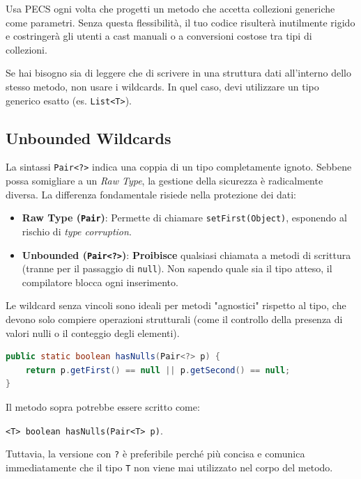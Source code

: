 \begin{bestpractice}
    Usa PECS ogni volta che progetti un metodo che accetta collezioni generiche come parametri. Senza questa flessibilità, il tuo codice risulterà inutilmente rigido e costringerà gli utenti a cast manuali o a conversioni costose tra tipi di collezioni.
\end{bestpractice}

\begin{warningbox}
    Se hai bisogno sia di leggere che di scrivere in una struttura dati all'interno dello stesso metodo, non usare i wildcards. In quel caso, devi utilizzare un tipo generico esatto (es. \texttt{List<T>}).
\end{warningbox}

\subsection{Unbounded Wildcards}

La sintassi \texttt{Pair<?>} indica una coppia di un tipo completamente ignoto. Sebbene possa somigliare a un \textit{Raw Type}, la gestione della sicurezza è radicalmente diversa. La differenza fondamentale risiede nella protezione dei dati:
\begin{itemize}
    \item \textbf{Raw Type (\texttt{Pair})}: Permette di chiamare \texttt{setFirst(Object)}, esponendo al rischio di \textit{type corruption}.
    \item \textbf{Unbounded (\texttt{Pair<?>})}: \textbf{Proibisce} qualsiasi chiamata a metodi di scrittura (tranne per il passaggio di \texttt{null}). Non sapendo quale sia il tipo atteso, il compilatore blocca ogni inserimento.
\end{itemize}

\medskip

Le wildcard senza vincoli sono ideali per metodi "agnostici" rispetto al tipo, che devono solo compiere operazioni strutturali (come il controllo della presenza di valori nulli o il conteggio degli elementi).

\begin{lstlisting}[language=Java]
public static boolean hasNulls(Pair<?> p) {
    return p.getFirst() == null || p.getSecond() == null;
}
\end{lstlisting}

\begin{observation}
    Il metodo sopra potrebbe essere scritto come:
    \begin{center}
        \texttt{<T> boolean hasNulls(Pair<T> p)}.
    \end{center}
    Tuttavia, la versione con \texttt{?} è preferibile perché più concisa e comunica immediatamente che il tipo \texttt{T} non viene mai utilizzato nel corpo del metodo.
\end{observation}

